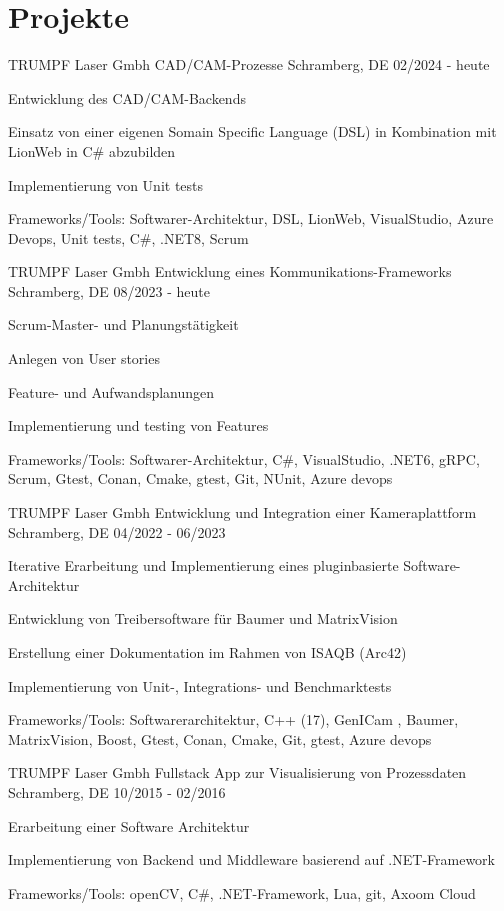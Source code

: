 \section{Projekte}

\cventry
{TRUMPF Laser Gmbh} %
{CAD/CAM-Prozesse} %
{Schramberg, DE} %
{02/2024 - heute} %
\begin{cvitems}
	\item{Entwicklung des CAD/CAM-Backends}
	\item{Einsatz von einer eigenen Somain Specific Language (DSL) in Kombination mit LionWeb in C\# abzubilden}
	\item{Implementierung von Unit tests}
	\item{Frameworks/Tools: Softwarer-Architektur, DSL, LionWeb, VisualStudio, Azure Devops, Unit tests, C\#, .NET8, Scrum}
\end{cvitems}

\cventry
{TRUMPF Laser Gmbh} %
{Entwicklung eines Kommunikations-Frameworks } %
{Schramberg, DE} %
{08/2023 - heute} %
\begin{cvitems}
	\item{Scrum-Master- und Planungstätigkeit}
	\item{Anlegen von User stories}
	\item{Feature- und Aufwandsplanungen}
	\item{Implementierung und testing von Features}
	\item {Frameworks/Tools:  Softwarer-Architektur, C\#, VisualStudio, .NET6, gRPC, Scrum,  Gtest, Conan, Cmake, gtest, Git, NUnit, Azure devops }
\end{cvitems}

\cventry
{TRUMPF Laser Gmbh} %
{Entwicklung und Integration einer Kameraplattform} %
{Schramberg, DE} %
{04/2022 - 06/2023} %
\begin{cvitems}
	\item{Iterative Erarbeitung und Implementierung eines pluginbasierte Software-Architektur}
	\item{Entwicklung von Treibersoftware für Baumer und MatrixVision}
	\item{Erstellung einer Dokumentation im Rahmen von ISAQB (Arc42)}
	\item{Implementierung von Unit-, Integrations- und Benchmarktests}
	\item{Frameworks/Tools:  Softwarerarchitektur, C++ (17), GenICam , Baumer, MatrixVision, Boost, Gtest, Conan, Cmake, Git, gtest, Azure devops}
\end{cvitems}

\cventry
{TRUMPF Laser Gmbh} %
{Fullstack App zur Visualisierung von Prozessdaten} %
{Schramberg, DE} %
{10/2015 - 02/2016} %
\begin{cvitems}
	\item{Erarbeitung einer Software Architektur }
	\item{Implementierung von Backend und Middleware basierend auf .NET-Framework}
	\item{Frameworks/Tools: openCV, C\#, .NET-Framework,  Lua,  git, Axoom Cloud}
\end{cvitems}